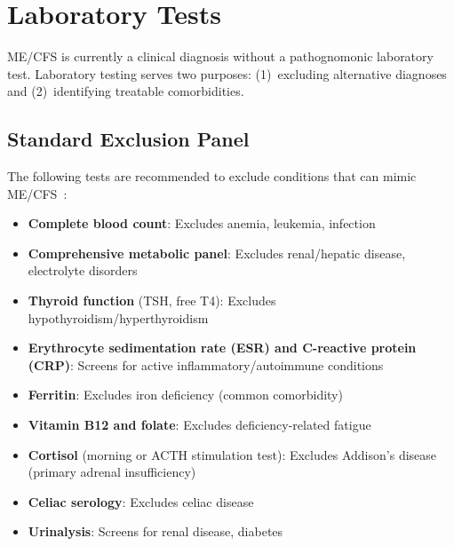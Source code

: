 \section{Laboratory Tests}
\label{sec:laboratory-tests}

ME/CFS is currently a clinical diagnosis without a pathognomonic laboratory test. Laboratory testing serves two purposes: (1)~excluding alternative diagnoses and (2)~identifying treatable comorbidities.

\subsection{Standard Exclusion Panel}

The following tests are recommended to exclude conditions that can mimic ME/CFS~\cite{NICE2021mecfs,Carruthers2011ICC}:

\begin{itemize}
    \item \textbf{Complete blood count}: Excludes anemia, leukemia, infection
    \item \textbf{Comprehensive metabolic panel}: Excludes renal/hepatic disease, electrolyte disorders
    \item \textbf{Thyroid function} (TSH, free T4): Excludes hypothyroidism/hyperthyroidism
    \item \textbf{Erythrocyte sedimentation rate (ESR) and C-reactive protein (CRP)}: Screens for active inflammatory/autoimmune conditions
    \item \textbf{Ferritin}: Excludes iron deficiency (common comorbidity)
    \item \textbf{Vitamin B12 and folate}: Excludes deficiency-related fatigue
    \item \textbf{Cortisol} (morning or ACTH stimulation test): Excludes Addison's disease (primary adrenal insufficiency)
    \item \textbf{Celiac serology}: Excludes celiac disease
    \item \textbf{Urinalysis}: Screens for renal disease, diabetes
\end{itemize}

